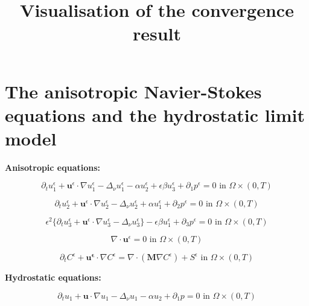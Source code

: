 \documentclass[11pt]{article}
\title{Visualisation of the convergence result}
\date{}
\begin{document}
\maketitle

\newpage
\tableofcontents
\newpage

\section{The anisotropic Navier-Stokes equations and the hydrostatic limit model}

\textbf{Anisotropic equations:}

    \begin{equation} \label{ANSC1}
    \partial_t u^\epsilon _1 + \mathbf{u}^\epsilon \cdot \nabla u^\epsilon _1 -\Delta_\nu u^\epsilon _1 -\alpha u_2^\epsilon + \epsilon \beta u_3^\epsilon + \partial_1 p^\epsilon = 0 \text{ in } \Omega \times (0,T)
    \end{equation}
    
    \begin{equation} \label{ANSC2}
    \partial_t u_2^\epsilon + \mathbf{u}^\epsilon \cdot \nabla u_2^\epsilon -\Delta_\nu u_2^\epsilon + \alpha u_1^\epsilon + \partial_2 p^\epsilon = 0 \text{ in } \Omega \times (0,T)
    \end{equation}
    
    \begin{equation} \label{ANSC3}
    \epsilon^2 \{  \partial_t u_3^\epsilon + \mathbf{u}^\epsilon \cdot \nabla u_3^\epsilon -\Delta_\nu u_3^{\epsilon} \} - \epsilon \beta u_1^\epsilon + \partial_3 p^\epsilon = 0 \text{ in } \Omega \times (0,T)
    \end{equation}
    
    \begin{equation} \label{ANSC4}
    \nabla \cdot \mathbf{u}^\epsilon= 0 \text{ in } \Omega \times (0,T)
    \end{equation}
    
    \begin{equation} \label{ANSC5}
    \partial_t C^\epsilon + \mathbf{u^\epsilon} \cdot \nabla C^\epsilon = \nabla \cdot (\mathbf{M} \nabla C^\epsilon) + S^\epsilon \text{ in } \Omega \times (0,T)
    \end{equation}
    
\textbf{Hydrostatic equations:}

    \begin{equation} \label{HNSC1}    
    \partial_t u_1 + \mathbf{u} \cdot \nabla u_1 - \Delta_\nu u_1 -\alpha u_2 + \partial_1 p = 0 \text{ in } \Omega \times (0,T)
    \end{equation}
    
\end{document}
